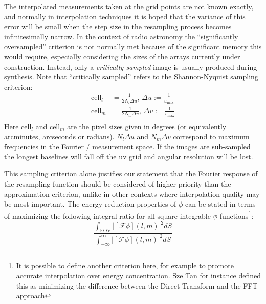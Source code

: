  The interpolated measurements taken at the grid points are not known exactly, and normally in interpolation techniques it is 
 hoped that the variance of this error will be small when the step size in the resampling process becomes infinitesimally narrow. 
 In the context of radio astronomy the ``significantly oversampled'' criterion is not normally met because of the significant 
 memory this would require, especially considering the sizes of the arrays currently under construction. Instead, only a 
 \emph{critically sampled} image is usually produced during synthesis. Note that ``critically sampled'' refers to 
 the Shannon-Nyquist sampling criterion:
 \begin{equation}
  \label{eqn_img_sampling}
  \begin{split}
    \text{cell}_l &= \frac{1}{2N_l\Delta{u}}\text{, }\Delta{u}:=\frac{1}{u_{\text{max}}}\\
    \text{cell}_m &= \frac{1}{2N_m\Delta{v}}\text{, }\Delta{v}:=\frac{1}{v_{\text{max}}}\\
  \end{split}
 \end{equation}
 Here $\text{cell}_l$ and $\text{cell}_m$ are the pixel sizes given in degrees (or equivalently arcminutes, arcseconds or radians). $N_l\Delta{u}$ and
 $N_m\Delta{v}$ correspond to maximum frequencies in the Fourier / measurement space. If the images are 
 sub-sampled the longest baselines will fall off the uv grid and angular resolution will be lost. 
 
 This sampling criterion alone justifies our statement that the Fourier response of the resampling function should be considered of higher priority
 than the approximation criterion, unlike in other contexts where interpolation quality may be most important. The energy reduction properties of
 $\phi$ can be stated in terms of maximizing the following integral ratio for all square-integrable $\phi$ functions\footnote{It is possible to
 define another criterion here, for example to promote accurate interpolation over energy concentration. Sze Tan \cite{tan1986aperture} for 
 instance defined this as minimizing the difference between the Direct Transform and the FFT approach}:
 \begin{equation}
  \label{eqn_aliasing_energy}
  \frac{\int_{\text{FOV}}{|[\mathcal{F}\phi](l,m)|^2dS}}{\int_{-\infty}^{\infty}{|[\mathcal{F}\phi](l,m)|^2dS}}
 \end{equation}
 
